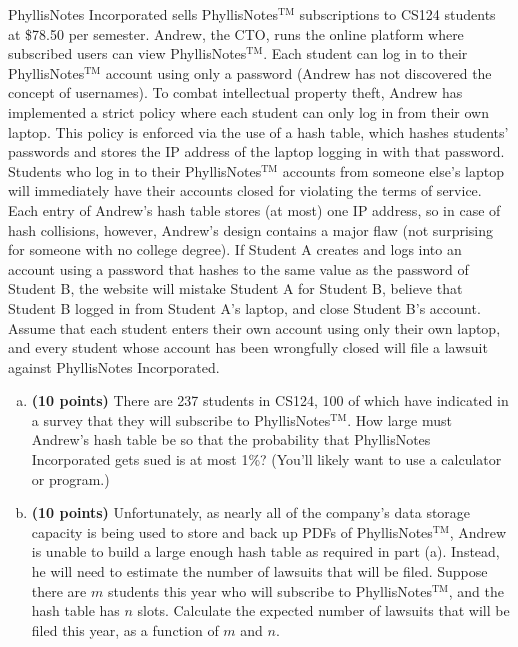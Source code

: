 \documentclass[11pt,letterpaper]{article}
\begin{document}
\pagebreak
\begin{problem}
    PhyllisNotes Incorporated sells PhyllisNotes$^{\mathrm{TM}}$ subscriptions to CS124 students at \$78.50 per semester. Andrew, the CTO, runs the online platform where subscribed users can view PhyllisNotes$^{\mathrm{TM}}$. Each student can log in to their PhyllisNotes$^{\mathrm{TM}}$ account using only a password (Andrew has not discovered the concept of usernames). To combat intellectual property theft, Andrew has implemented a strict policy where each student can only log in from their own laptop. This policy is enforced via the use of a hash table, which hashes students' passwords and stores the IP address of the laptop logging in with that password. Students who log in to their PhyllisNotes$^{\mathrm{TM}}$ accounts from someone else's laptop will immediately have their accounts closed for violating the terms of service. Each entry of Andrew's hash table stores (at most) one IP address, so in case of hash collisions, however, Andrew's design contains a major flaw (not surprising for someone with no college degree). If Student A creates and logs into an account using a password that hashes to the same value as the password of Student B, the website will mistake Student A for Student B, believe that Student B logged in from Student A's laptop, and close Student B's account. Assume that each student enters their own account using only their own laptop, and every student whose account has been wrongfully closed will file a lawsuit against PhyllisNotes Incorporated.
    \begin{enumerate}[(a)]
        \item {\bf (10 points)} There are 237 students in CS124, 100 of which have indicated in a survey that they will subscribe to PhyllisNotes$^{\mathrm{TM}}$. How large must Andrew's hash table be so that the probability that PhyllisNotes Incorporated gets sued is at most 1\%? (You'll likely want to use a calculator or program.)
        \item {\bf (10 points)} Unfortunately, as nearly all of the company's data storage capacity is being used to store and back up PDFs of PhyllisNotes$^{\mathrm{TM}}$, Andrew is unable to build a large enough hash table as required in part (a). Instead, he will need to estimate the number of lawsuits that will be filed.
        Suppose there are $m$ students this year who will subscribe to PhyllisNotes$^{\mathrm{TM}}$, and the
        hash table has $n$ slots. Calculate the expected number of lawsuits that will be filed this
        year, as a function of $m$ and $n$.
    \end{enumerate}
\end{problem}
\end{document}
